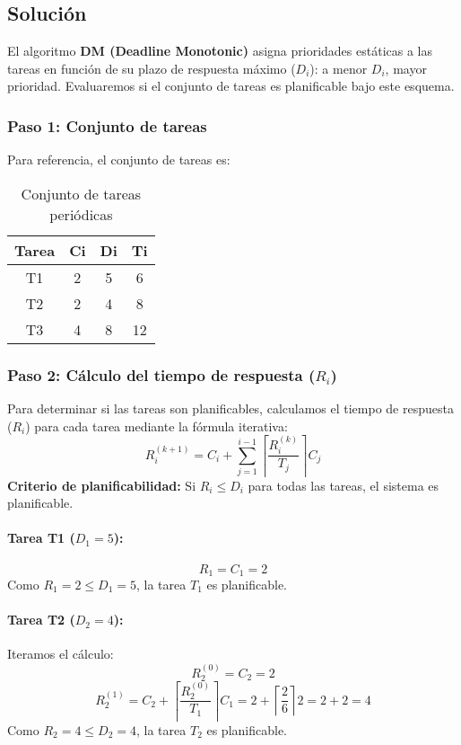 \documentclass[a4paper,12pt]{article}
\begin{document}
\subsection{Solución}
El algoritmo \textbf{DM (Deadline Monotonic)} asigna prioridades estáticas a las tareas en función de su plazo de respuesta máximo (\(D_i\)): a menor \(D_i\), mayor prioridad. Evaluaremos si el conjunto de tareas es planificable bajo este esquema.

\subsubsection{Paso 1: Conjunto de tareas}
Para referencia, el conjunto de tareas es:
\begin{table}[H]
\centering
\begin{tabular}{|c|c|c|c|}
\hline
\textbf{Tarea} & \textbf{Ci} & \textbf{Di} & \textbf{Ti} \\ \hline
T1 & 2 & 5 & 6 \\ \hline
T2 & 2 & 4 & 8 \\ \hline
T3 & 4 & 8 & 12 \\ \hline
\end{tabular}
\caption{Conjunto de tareas periódicas}
\end{table}

\subsubsection{Paso 2: Cálculo del tiempo de respuesta (\(R_i\))}
Para determinar si las tareas son planificables, calculamos el tiempo de respuesta (\(R_i\)) para cada tarea mediante la fórmula iterativa:
\[
R_i^{(k+1)} = C_i + \sum_{j=1}^{i-1} \left\lceil \frac{R_i^{(k)}}{T_j} \right\rceil C_j
\]
\textbf{Criterio de planificabilidad:} Si \(R_i \leq D_i\) para todas las tareas, el sistema es planificable.

\paragraph{Tarea T1 (\(D_1 = 5\)):}
\[
R_1 = C_1 = 2
\]
Como \(R_1 = 2 \leq D_1 = 5\), la tarea \(T_1\) es planificable.

\paragraph{Tarea T2 (\(D_2 = 4\)):}
Iteramos el cálculo:
\[
R_2^{(0)} = C_2 = 2
\]
\[
R_2^{(1)} = C_2 + \left\lceil \frac{R_2^{(0)}}{T_1} \right\rceil C_1 = 2 + \left\lceil \frac{2}{6} \right\rceil 2 = 2 + 2 = 4
\]
Como \(R_2 = 4 \leq D_2 = 4\), la tarea \(T_2\) es planificable.
\end{document}
